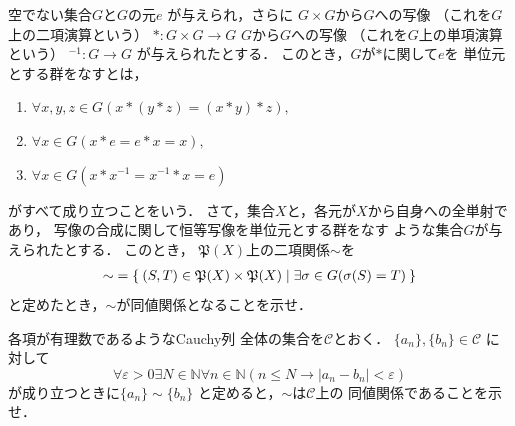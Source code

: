    \begin{que} \label{que:groupdouti}
     空でない集合$G$と$G$の元$e$
     が与えられ，さらに
     $G \times G$から$G$への写像
     （これを$G$上の二項演算という）
     $\ast : G \times G \longrightarrow G$
     $G$から$G$への写像
     （これを$G$上の単項演算という）
     ${}^{-1} : G \longrightarrow G$
     が与えられたとする．
     このとき，$G$が$\ast$に関して$e$を
     単位元とする群をなすとは，
     \begin{enumerate}[G1.]
       \item $\forall x,y,z \in G
         (x \ast (y \ast z) =
         (x \ast y) \ast z ),$
       \item $\forall x \in G
         (x \ast e = e \ast x = x),$
       \item $\forall x \in G 
         (x \ast x^{-1} = x^{-1} \ast x = e)$
     \end{enumerate}
     がすべて成り立つことをいう．
     さて，集合$X$と，各元が$X$から自身への全単射であり，
     写像の合成に関して恒等写像を単位元とする群をなす
     ような集合$G$が与えられたとする．
     このとき，
     $\mathfrak{P} (X)$上の二項関係$\sim$を
     \begin{align*}
       {\sim} = \Set{ (S,T) \in \mathfrak{P}(X) \times \mathfrak{P}(X) 
       \mid \exists \sigma \in G (\sigma (S) = T)}
     \end{align*}
     と定めたとき，$\sim$が同値関係となることを示せ．
   \end{que}

   \begin{que} \label{que:cauchyretu}
     各項が有理数であるようなCauchy列
     全体の集合を$\mathcal{C}$とおく．
     $\{ a_n \} , \{ b_n \} \in \mathcal{C}$
     に対して
     \[
       \forall \varepsilon > 0
       \exists N \in \mathbb{N}
       \forall n \in \mathbb{N}
       ( n \leq N \to
       \lvert a_n - b_n \rvert < \varepsilon )
     \]
     が成り立つときに$\{ a_n \} \sim \{ b_n \}$
     と定めると，$\sim$は$\mathcal{C}$上の
     同値関係であることを示せ．
   \end{que}

